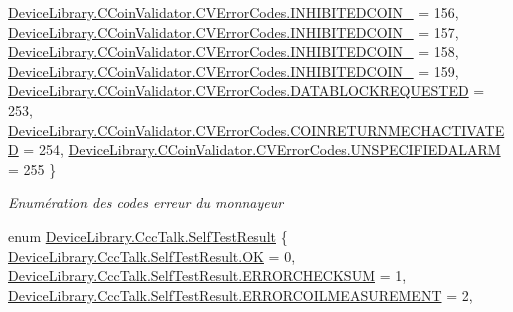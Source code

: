 \begin{DoxyCompactItemize}
\mbox{\hyperlink{group___erreur_gga68c5b73cc3b337502d9f92154d933591a847a981b702782737c4d8d68ae43df96}{Device\+Library.\+C\+Coin\+Validator.\+C\+V\+Error\+Codes.\+I\+N\+H\+I\+B\+I\+T\+E\+D\+C\+O\+I\+N\+\_}} = 156, 
\mbox{\hyperlink{group___erreur_gga68c5b73cc3b337502d9f92154d933591a9eacc103c55f026c6d4c55d9145dc46c}{Device\+Library.\+C\+Coin\+Validator.\+C\+V\+Error\+Codes.\+I\+N\+H\+I\+B\+I\+T\+E\+D\+C\+O\+I\+N\+\_}} = 157, 
\mbox{\hyperlink{group___erreur_gga68c5b73cc3b337502d9f92154d933591a7650c785d588d5d802dc392398b5731a}{Device\+Library.\+C\+Coin\+Validator.\+C\+V\+Error\+Codes.\+I\+N\+H\+I\+B\+I\+T\+E\+D\+C\+O\+I\+N\+\_}} = 158, 
\newline
\mbox{\hyperlink{group___erreur_gga68c5b73cc3b337502d9f92154d933591a0e534ed5f2068211f3b791d94aada1e2}{Device\+Library.\+C\+Coin\+Validator.\+C\+V\+Error\+Codes.\+I\+N\+H\+I\+B\+I\+T\+E\+D\+C\+O\+I\+N\+\_}} = 159, 
\mbox{\hyperlink{group___erreur_gga68c5b73cc3b337502d9f92154d933591a05062f9114d515e6e34b9b781a68e042}{Device\+Library.\+C\+Coin\+Validator.\+C\+V\+Error\+Codes.\+D\+A\+T\+A\+B\+L\+O\+C\+K\+R\+E\+Q\+U\+E\+S\+T\+ED}} = 253, 
\mbox{\hyperlink{group___erreur_gga68c5b73cc3b337502d9f92154d933591aa0d2119ea2041bc3e038f9f5f6f5f7b1}{Device\+Library.\+C\+Coin\+Validator.\+C\+V\+Error\+Codes.\+C\+O\+I\+N\+R\+E\+T\+U\+R\+N\+M\+E\+C\+H\+A\+C\+T\+I\+V\+A\+T\+ED}} = 254, 
\mbox{\hyperlink{group___erreur_gga68c5b73cc3b337502d9f92154d933591a9993b5434242a3193a7a92cfe80b28ab}{Device\+Library.\+C\+Coin\+Validator.\+C\+V\+Error\+Codes.\+U\+N\+S\+P\+E\+C\+I\+F\+I\+E\+D\+A\+L\+A\+RM}} = 255
 \}
\begin{DoxyCompactList}\small\item\em Enumération des codes erreur du monnayeur \end{DoxyCompactList}\item 
enum \mbox{\hyperlink{group___erreur_ga179570d2d8f6f95d52ccafb98d20c790}{Device\+Library.\+Ccc\+Talk.\+Self\+Test\+Result}} \{ \newline
\mbox{\hyperlink{group___erreur_gga179570d2d8f6f95d52ccafb98d20c790ae0aa021e21dddbd6d8cecec71e9cf564}{Device\+Library.\+Ccc\+Talk.\+Self\+Test\+Result.\+OK}} = 0, 
\mbox{\hyperlink{group___erreur_gga179570d2d8f6f95d52ccafb98d20c790a82728633b7a7c49ed136d5c3aa605861}{Device\+Library.\+Ccc\+Talk.\+Self\+Test\+Result.\+E\+R\+R\+O\+R\+C\+H\+E\+C\+K\+S\+UM}} = 1, 
\mbox{\hyperlink{group___erreur_gga179570d2d8f6f95d52ccafb98d20c790aa4c8c213e52281611bbc2d726f23959a}{Device\+Library.\+Ccc\+Talk.\+Self\+Test\+Result.\+E\+R\+R\+O\+R\+C\+O\+I\+L\+M\+E\+A\+S\+U\+R\+E\+M\+E\+NT}} = 2, 

\end{DoxyCompactItemize}
